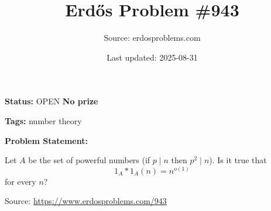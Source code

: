 \documentclass{article}
\title{Erd\H{o}s Problem \#943}
\date{Last updated: 2025-08-31}
\author{Source: erdosproblems.com}
\begin{document}
\maketitle

\noindent\textbf{Status:} OPEN \quad \textbf{No prize}

\noindent\textbf{Tags:} number theory

\medskip
\noindent\textbf{Problem Statement:}

Let $A$ be the set of powerful numbers (if $p\mid n$ then $p^2\mid n$). Is it true that\[1_A\ast 1_A(n)=n^{o(1)}\]for every $n$?

\bigskip
\noindent\small{Source: \url{https://www.erdosproblems.com/943}}
\end{document}
